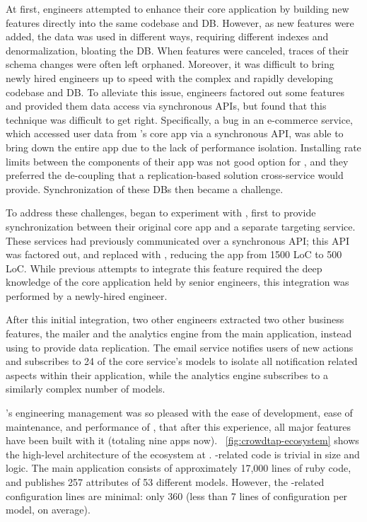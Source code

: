 At first, engineers attempted to enhance their core application by building new features directly into the same codebase and DB.
However, as new features were added, the data was used in different ways, requiring different indexes and denormalization, bloating the DB.
When features were canceled, traces of their schema changes were often left orphaned.
Moreover, it was difficult to bring newly hired engineers up to speed with the complex and rapidly developing codebase and DB.
To alleviate this issue, engineers factored out some features and provided them
data access via synchronous APIs, but found that this technique was difficult to
get right.
Specifically, a bug in an e-commerce service, which accessed user data from
\crowdtap's core app via a synchronous API, was able to bring down the entire app due to
the lack of performance isolation.  Installing rate limits between the components
of their app was not good option for \crowdtap, and they preferred the
de-coupling that a replication-based solution cross-service would provide.
Synchronization of these DBs then became a challenge.

To address these challenges, \crowdtap began to experiment with \synapse,
first to provide synchronization between their original core app and a separate
targeting service.  These services had previously communicated over a
synchronous API; this API was factored out, and replaced with \synapse,
reducing the app from 1500 LoC to 500 LoC.  While previous attempts to integrate
this feature required the deep knowledge of the core application held by senior
engineers, this integration was performed by a newly-hired engineer.

After this initial integration, two other \crowdtap engineers extracted two other business features, the mailer and the analytics engine from the main application, instead using \synapse to provide data replication.
The email service notifies users of new actions and subscribes to 24 of the core service's models to isolate all notification related aspects within their application, while the analytics engine subscribes to a similarly complex number of models.

\crowdtap's engineering management was so pleased with the ease of development, ease of maintenance, and performance of \synapse, that after this experience, all major features have been built with it (totaling nine apps now).
\F~\ref{fig:crowdtap-ecosystem} shows the high-level architecture of the \synapse ecosystem at \crowdtap.
\synapse-related code is trivial in size and logic.
The \crowdtap main application consists of approximately 17,000 lines of ruby code, and publishes 257 attributes of 53 different models.
However, the \synapse-related configuration lines are minimal: only 360 (less
than 7 lines of configuration per model, on average).

